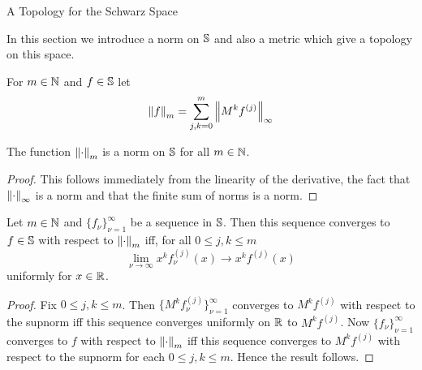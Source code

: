 \begin{section}{A Topology for the Schwarz Space}

	In this section we introduce a norm on $\schwarz$
	and also a metric which give a topology on this space.
	

\begin{defn}
	For $\isnatrl[m]$ and $f \in \schwarz$ let
		\begin{displaymath}
			\norm[m]{f} = \sum_{j,k=0}^m \supnorm{M^k f^{(j)}}
		\end{displaymath}
\end{defn}

\begin{prop}
	The function $\norm[m]{\cdot}$ is a norm on $\schwarz$
	for all $\isnatrl[m]$.
\end{prop}

\begin{proof}
	This follows immediately from the linearity of the derivative,
	the fact that $\supnorm{\cdot}$	is a norm and that the finite 
	sum of norms is a norm.
\end{proof}


\begin{prop}
	Let $\isnatrl[m]$ and $\{f_\nu\}_{\nu=1}^\infty$ be a sequence in $\schwarz$.
	Then this sequence converges to $f \in \schwarz$ with respect to $\norm[m]{\cdot}$
	iff, for all $0 \leq j,k \leq m$
		\begin{displaymath}
			\lim_{\nu \rightarrow \infty} x^k f_\nu^{(j)}(x)
				\rightarrow x^k f^{(j)}(x)
		\end{displaymath}
	uniformly for $\isreal$.
\end{prop}

\begin{proof}
	Fix $0 \leq j,k \leq m$. Then $\{M^k f_\nu^{(j)}\}_{\nu=1}^\infty$
	converges to $M^k f^{(j)}$ with respect to the supnorm iff this
	sequence converges uniformly on $\real$ to $M^k f^{(j)}$.
	Now $\{f_\nu\}_{\nu=1}^\infty$ converges to $f$ with respect to
	$\norm[m]{\cdot}$ iff this sequence converges to $M^k f^{(j)}$ 
	with respect to the supnorm for each $0 \leq j,k \leq m$. Hence
	the result follows.
\end{proof}


\end{section}
